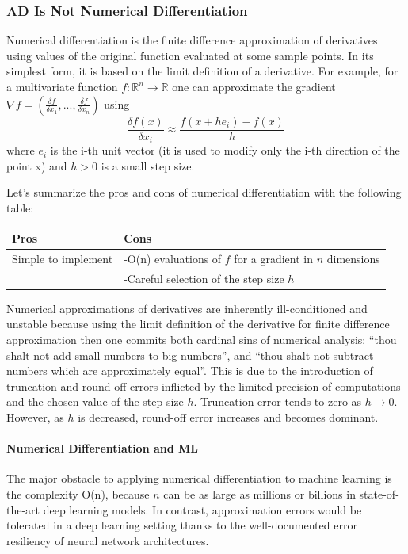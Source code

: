 \subsubsection{AD Is Not Numerical Differentiation}
Numerical differentiation is the finite difference approximation of derivatives using values of the original function evaluated at some sample points. In its simplest form, it is based on the limit definition of a derivative. For example, for a multivariate function $f:\mathbb{R}^n\rightarrow \mathbb{R}$ one can approximate the gradient $\nabla f = (\frac{\delta f}{\delta x_1},...,\frac{\delta f}{\delta x_n})$ using
$$ \frac{\delta f (x)}{\delta x_i} \approx \frac{f(x+he_i)-f(x)}{h} $$
where $e_i$ is the i-th unit vector (it is used to modify only the i-th direction of the point x) and $h>0$ is a small step size.

Let's summarize the pros and cons of numerical differentiation with the following table:

\begin{center}
\begin{tabular}{ |l|l| } 
\hline
 Pros & Cons\\
\hline
Simple to implement & -O(n) evaluations of $f$ for a gradient in $n$ dimensions \\ 
 & -Careful selection of the step size $h$ \\ \hline
\end{tabular}
\end{center}
Numerical approximations of derivatives are inherently ill-conditioned and unstable  because using the limit definition of the derivative for finite difference approximation then one commits both cardinal sins of numerical analysis: “thou shalt not add small numbers to big numbers”, and “thou shalt not subtract numbers which are approximately equal”. This is due to the introduction of truncation and round-off errors inflicted by the limited precision of computations and the chosen value of the step size $h$. Truncation error tends to zero as $h \rightarrow 0$. However, as $h$ is decreased, round-off error increases and becomes dominant.

\paragraph{Numerical Differentiation and ML} The major obstacle to applying numerical differentiation to machine learning is the complexity O(n), because $n$ can be as large as millions or billions in state-of-the-art deep learning models. In contrast, approximation errors would be tolerated in a deep learning setting thanks to the well-documented error resiliency of neural network architectures.

